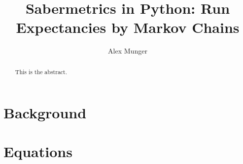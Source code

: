 \documentclass[]{article}
\title{Sabermetrics in Python: Run Expectancies by Markov Chains}
\author{Alex Munger}
\begin{document}
\maketitle

\begin{abstract}
	This is the abstract.
\end{abstract}

\section{Background}

\section{Equations}
\end{document}
